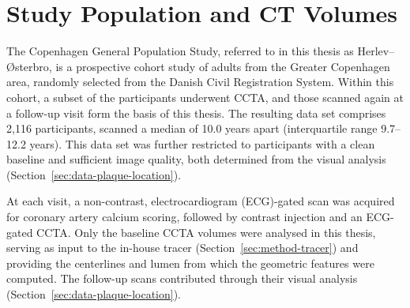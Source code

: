 \section{Study Population and CT Volumes}
\label{sec:data-cohort}

The Copenhagen General Population Study, referred to in this thesis as Herlev--{\O}sterbro, is a prospective cohort study of adults from the Greater Copenhagen area, randomly selected from the Danish Civil Registration System.
Within this cohort, a subset of the participants underwent CCTA, and those scanned again at a follow-up visit form the basis of this thesis.
The resulting data set comprises 2,116 participants, scanned a median of 10.0 years apart (interquartile range 9.7--12.2 years).
This data set was further restricted to participants with a clean baseline and sufficient image quality, both determined from the visual analysis (Section~\ref{sec:data-plaque-location}).

At each visit, a non-contrast, electrocardiogram (ECG)-gated scan was acquired for coronary artery calcium scoring, followed by contrast injection and an ECG-gated CCTA.
Only the baseline CCTA volumes were analysed in this thesis, serving as input to the in-house tracer (Section~\ref{sec:method-tracer}) and providing the centerlines and lumen from which the geometric features were computed.
The follow-up scans contributed through their visual analysis (Section~\ref{sec:data-plaque-location}).
